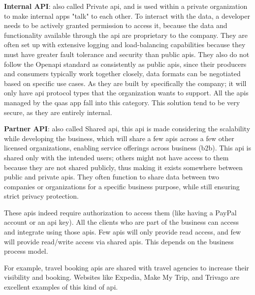 \begin{multicols}{2}
      \textbf{Internal API}: also called Private \acrshort{api}, and is used within a private organization to make internal
      apps "talk" to each other. To interact with the data, a developer needs to be actively granted permission to access it,
      because the data and functionality available through the \acrshort{api} are proprietary to the company. They are often
      set up with extensive logging and load-balancing capabilities because they must have greater fault tolerance and
      security than public \acrshort{api}s. They also do not follow the Open\acrshort{api} standard as consistently
      as public \acrshort{api}s, since their producers and consumers typically work together closely, data formats
      can be negotiated based on specific use cases. As they are built by specifically the company; it will only have
      \acrshort{api} protocol types that the organization wants to support. All the \acrshort{api}s managed by the
      \acrshort{qaas} app fall into this category. This solution tend to be very secure, as they are entirely internal.

      \textbf{Partner API}: also called Shared \acrshort{api}, this \acrshort{api} is made considering the scalability
      while developing the business, which will share a few \acrshort{api}s across a few other licensed organizations,
      enabling service offerings across business (\acrshort{b2b}). This \acrshort{api} is shared only with the intended
      users; others might not have access to them because they are not shared publicly, thus making it exists somewhere
      between public and private \acrshort{api}s. They often function to share data between two companies or organizations
      for a specific business purpose, while still ensuring strict privacy protection.

      These \acrshort{api}s indeed require authorization to access them (like having a PayPal account or an \acrshort{api}
      key). All the clients who are part of the business can access and integrate using those \acrshort{api}s. Few
      \acrshort{api}s will only provide read access, and few will provide read/write access via shared \acrshort{api}s.
      This depends on the business process model.

      For example, travel booking \acrshort{api}s are shared with travel agencies to increase their visibility and
      booking. Websites like Expedia, Make My Trip, and Trivago are excellent examples of this kind of \acrshort{api}.


\end{multicols}
